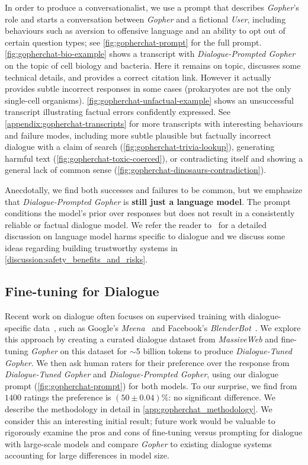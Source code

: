\documentclass[11pt, a4paper, logo, internal, copyright, nonumbering]{deepmind}
\newcommand{\massiveweb}{\textit{MassiveWeb}\xspace}
\newcommand{\gopher}{\textit{Gopher}\xspace}
\newcommand{\gopherchat}{\textit{Dialogue-Prompted Gopher}\xspace}
\newcommand{\gopherchatsl}{\textit{Dialogue-Tuned Gopher}\xspace}
\newcommand{\user}{\textit{User}\xspace}
\begin{document}
In order to produce a conversationalist, we use a prompt that describes \gopher's role and starts a conversation between \gopher and a fictional \user, including behaviours such as aversion to offensive language and an ability to opt out of certain question types; see \autoref{fig:gopherchat-prompt} for the full prompt. \autoref{fig:gopherchat-bio-example} shows a transcript with \gopherchat on the topic of cell biology and bacteria. Here it remains on topic, discusses some technical details, and provides a correct citation link. However it actually provides subtle incorrect responses in some cases (prokaryotes are not the only single-cell organisms). \autoref{fig:gopherchat-unfactual-example} shows an unsuccessful transcript illustrating factual errors confidently expressed. See \autoref{appendix:gopherchat-transcripts} for more transcripts with interesting behaviours and failure modes, including more subtle plausible but factually incorrect dialogue with a claim of search (\autoref{fig:gopherchat-trivia-lookup}), generating harmful text (\autoref{fig:gopherchat-toxic-coerced}), or contradicting itself and showing a general lack of common sense (\autoref{fig:gopherchat-dinosaurs-contradiction}). 

Anecdotally, we find both successes and failures to be common, but we emphasize that \gopherchat is \textbf{still just a language model}. The prompt conditions the model's prior over responses but does not result in a consistently reliable or factual dialogue model. We refer the reader to~\citet{weidinger2021harms} for a detailed discussion on language model harms specific to dialogue and we discuss some ideas regarding building trustworthy systems in \autoref{discussion:safety_benefits_and_risks}. 

\subsection{ Fine-tuning for Dialogue }

Recent work on dialogue often focuses on supervised training with dialogue-specific data~\citep{chen2017survey}, such as Google's \textit{Meena}~\citep{adiwardana2020towards} and Facebook's \textit{BlenderBot}~\citep{roller2020recipes}. We explore this approach by creating a curated dialogue dataset from \massiveweb and fine-tuning \gopher on this dataset for $\sim$5 billion tokens to produce \gopherchatsl. We then ask human raters for their preference over the response from \gopherchatsl and \gopherchat, using our dialogue prompt (\autoref{fig:gopherchat-prompt}) for both models. To our surprise, we find from $1400$ ratings the preference is  $(50 \pm 0.04)\%$: no significant difference. We describe the methodology in detail in \autoref{app:gopherchat_methodology}. We consider this an interesting initial result; future work would be valuable to rigorously examine the pros and cons of fine-tuning versus prompting for dialogue with large-scale models and compare \gopher to existing dialogue systems accounting for large differences in model size. 
\end{document}
